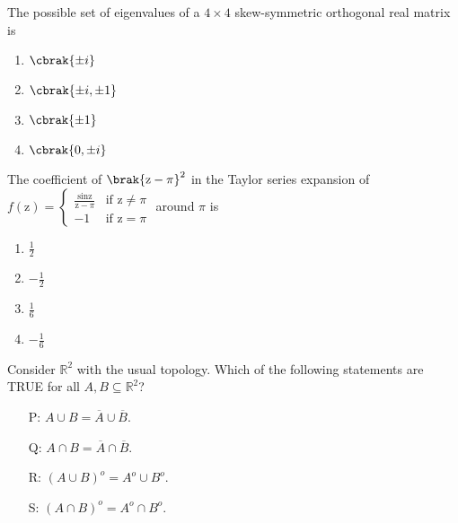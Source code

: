 \iffalse
    \title{Assignment}
    \author{AI24BTECH11024}
    \section{ma}
    \chapter{2013}
\fi
\item  The possible set of eigenvalues of a $ 4 \times 4 $ skew-symmetric orthogonal real matrix is
\begin{multicols}{4}
\begin{enumerate}
    \item $\cbrak{\pm i}$ 
    \item $\cbrak{\pm i,\pm 1}$
    \item $\cbrak{\pm 1}$
    \item $\cbrak{0,\pm i}$
\end{enumerate}
\end{multicols}
\item The coefficient of $ \brak{\text{z} - \pi}^{2}$ in the Taylor series expansion of
$
		f(\text{z}) = \begin{cases} \frac{\sin \text{z}}{\text{z} - \pi} & \text{if}\,\,\text{z} \neq \pi \\ -1 & \text{if}\,\,\text{z} = \pi \end{cases}
$
around $\pi$ is
\begin{multicols}{4}
\begin{enumerate}
    \item $\frac{1}{2}$ 
    \item $ -\frac{1}{2} $
    \item $ \frac{1}{6}$ 
    \item $ -\frac{1}{6}$ 
\end{enumerate}
\end{multicols}
\item  Consider $ \mathbb{R}^{2} $ with the usual topology. Which of the following statements are TRUE for all $ A, B \subseteq \mathbb{R}^{2}$?
\begin{itemize}
    \item[P:]$ A \cup B = \overline{A} \cup \overline{B} $.
    \item[Q:]$ A \cap B = \overline{A} \cap \overline{B} $.
    \item[R:]$ (A \cup B)^o = A^o \cup B^o $.
    \item[S:]$ (A \cap B)^o = A^o \cap B^o $.
\end{itemize}
